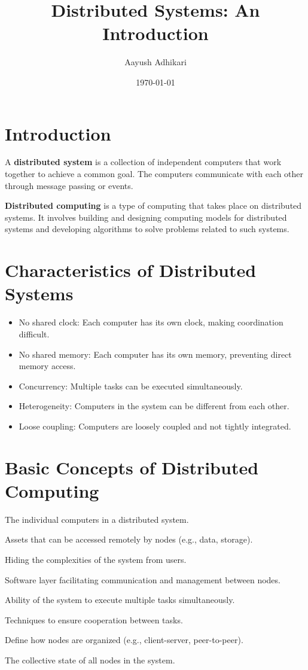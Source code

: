 \documentclass{article}
\title{\textbf{Distributed Systems: An Introduction}}
\author{Aayush Adhikari}
\date{\today}
\begin{document}
\maketitle

\section{Introduction}
A \textbf{distributed system} is a collection of independent computers that work together to achieve a common goal. The computers communicate with each other through message passing or events.

\textbf{Distributed computing} is a type of computing that takes place on distributed systems. It involves building and designing computing models for distributed systems and developing algorithms to solve problems related to such systems.

\section{Characteristics of Distributed Systems}
\begin{itemize}
    \item No shared clock: Each computer has its own clock, making coordination difficult.
    \item No shared memory: Each computer has its own memory, preventing direct memory access.
    \item Concurrency: Multiple tasks can be executed simultaneously.
    \item Heterogeneity: Computers in the system can be different from each other.
    \item Loose coupling: Computers are loosely coupled and not tightly integrated.
\end{itemize}

\section{Basic Concepts of Distributed Computing}
\begin{description}[itemsep=5pt, parsep=0pt]
    \item[Nodes:] The individual computers in a distributed system.
    \item[Resources:] Assets that can be accessed remotely by nodes (e.g., data, storage).
    \item[Distribution Transparency:] Hiding the complexities of the system from users.
    \item[Middleware:] Software layer facilitating communication and management between nodes.
    \item[Concurrency:] Ability of the system to execute multiple tasks simultaneously.
    \item[Coordination \& Synchronization:] Techniques to ensure cooperation between tasks.
    \item[Architectural Models:] Define how nodes are organized (e.g., client-server, peer-to-peer).
    \item[Global State:] The collective state of all nodes in the system.
\end{description}
\end{document}
